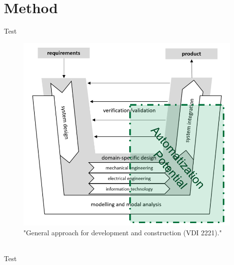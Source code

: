 \section{Method}
Test
\begin{figure}[h]
    \centering
    \includegraphics[scale=0.5]{pics/VDI_2206.PNG}
    \caption{\label{pic:VDI2206} "General approach for development and construction (VDI 2221)." \cite{Jansch2006THEDO}}
\end{figure}\\
Test
